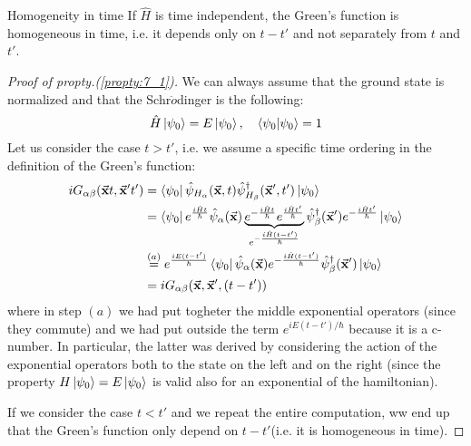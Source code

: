 \documentclass[../main/main.tex]{subfiles}
\begin{document}
\begin{property}{Homogeneity in time}{}
If \( \hat{H}  \) is time independent, the Green's function is homogeneous in time, i.e. it depends only on \( t-t' \) and not separately from \( t \) and \( t' \).
\label{propty:7_1}
\end{property}
\begin{proof}[Proof of propty.(\ref{propty:7_1})]
We can always assume that the ground state is normalized and that the Schr$\ddot{o}$dinger is the following:
\begin{equation*}
  \hat{H} \ket{\psi _0} = E \ket{\psi _0}, \quad \braket{\psi _0}{\psi _0}=1
\end{equation*}
Let us consider the case \( t>t' \), i.e. we assume a specific time ordering in the definition of the Green's function:
\begin{equation*}
\begin{split}
 i G_{\alpha \beta } (\va{x} t, \va{x}'t')  &= \bra{\psi _0 } \hat{\psi }_{H_ \alpha } (\va{x},t) \hat{\psi }_{H_ \beta }^\dag (\va{x}',t') \ket{\psi _0}     \\
 &= \bra{\psi _0 }  e^{\frac{i \hat{H} t}{\hbar }} \hat{\psi }_{ \alpha } (\va{x})
 \underbrace{e^{-\frac{i \hat{H} t}{\hbar }}  e^{\frac{i \hat{H} t'}{\hbar }}}_{e^{-\frac{i \hat{H} (t-t') }{\hbar }} }
  \hat{\psi }_{\beta }^\dag (\va{x}')  e^{-\frac{i \hat{H} t'}{\hbar }} \ket{\psi _0} \\
  & \overset{(a)}{=}   e^{\frac{i E (t-t')}{\hbar }}
  \bra{\psi _0}  \hat{\psi }_{\alpha  } (\va{x}) e^{-\frac{i \hat{H} (t-t') }{\hbar }}    \hat{\psi }_{\beta  }^\dag (\va{x}') \ket{\psi _0}\\
  &= i G_{\alpha \beta } (\va{x},\va{x}', (t-t'))
\end{split}
\end{equation*}
where in step \( (a) \) we had put togheter the middle exponential operators (since they commute) and we had put outside the term \( e^{i E (t-t')/\hbar } \) because it is a c-number. In particular, the latter was derived by considering the action of the exponential operators both to the state on the left and on the right (since the property \( H \ket{\psi _0} = E \ket{\psi _0}   \) is valid also for an exponential of the hamiltonian).

If we consider the case \( t<t' \) and we repeat the entire computation, ww end up that the Green's function only depend on \( t-t' \)(i.e. it is homogeneous in time).

\end{proof}
\end{document}
